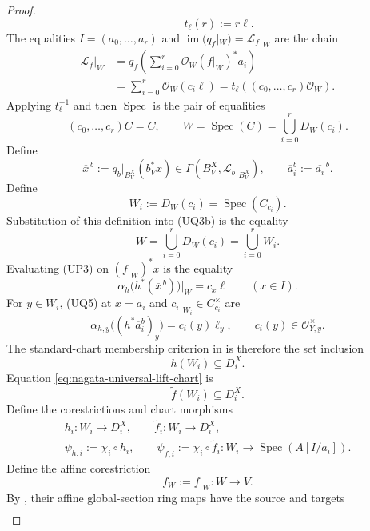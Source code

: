 \begin{proof}
\[    \qquad t_\ell(r):=r\ell.
  \]
  The equalities $I=(a_0,\ldots,a_r)$ and
  $\operatorname{im}(q_f|_W)=\mathcal L_f|_W$ are the chain
  \[
  \begin{aligned}
    \mathcal L_f|_W
      &=q_f\!\left(\sum_{i=0}^r
          \mathcal O_W(f|_W)^*a_i\right)\\
      &=\sum_{i=0}^r\mathcal O_W(c_i\ell)
       =t_\ell\!\left((c_0,\ldots,c_r)\mathcal O_W\right).
  \end{aligned}                                                \tag{UQ3a}
  \]
  Applying $t_\ell^{-1}$ and then $\operatorname{Spec}$ is the pair of
  equalities
  \[
    (c_0,\ldots,c_r)C=C,\qquad
    W=\operatorname{Spec}(C)
      =\bigcup_{i=0}^rD_W(c_i).                               \tag{UQ3b}
  \]
  Define
  \[
    \overline x^{\,b}:=
      q_b|_{B_V^X}(b_V^*x)
      \in\Gamma(B_V^X,\mathcal L_b|_{B_V^X}),\qquad
    \overline a_i^b:=\overline{a_i}^{\,b}.                    \tag{UQ4}
  \]
  Define
  \[
    W_i:=D_W(c_i)=\operatorname{Spec}(C_{c_i}).
  \]
  Substitution of this definition into (UQ3b) is the equality
  \[
    W=\bigcup_{i=0}^rD_W(c_i)=\bigcup_{i=0}^rW_i.                \tag{UQ3c}
  \]
  Evaluating (UP3) on $(f|_W)^*x$ is the equality
  \[
    \alpha_h\bigl(h^*(\overline x^{\,b})\bigr)|_W
      =c_x\ell\qquad(x\in I).                                 \tag{UQ5}
  \]
  For $y\in W_i$, (UQ5) at $x=a_i$ and
  $c_i|_{W_i}\in C_{c_i}^{\times}$ are
  \[
    \alpha_{h,y}\bigl((h^*\overline a_i^b)_y\bigr)
      =c_i(y)\ell_y,\qquad c_i(y)\in\mathcal O_{Y,y}^{\times}.
  \]
  The standard-chart membership criterion in
   is therefore the set inclusion
  \[
    h(W_i)\subseteq D_i^X.                                    \tag{UQ6}
  \]
  Equation \eqref{eq:nagata-universal-lift-chart} is
  \[
    \widetilde f(W_i)\subseteq D_i^X.                         \tag{UQ7}
  \]
  Define the
  corestrictions and chart morphisms
  \[
  \begin{gathered}
    h_i\colon W_i\to D_i^X,\qquad
    \widetilde f_i\colon W_i\to D_i^X,\\
    \psi_{h,i}:=\chi_i\circ h_i,\qquad
    \psi_{\widetilde f,i}:=\chi_i\circ\widetilde f_i
      \colon W_i\longrightarrow\operatorname{Spec}(A[I/a_i]).
  \end{gathered}
  \]
  Define the affine corestriction
  \[
    f_W:=f|_W\colon W\longrightarrow V.
  \]
  By , their affine
  global-section ring maps have the source and targets
  \[
  \begin{gathered}

\end{gathered}\]
\end{proof}
